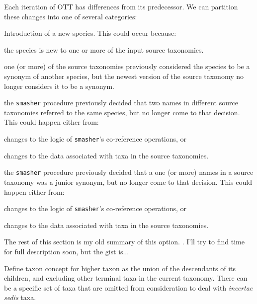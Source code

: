\documentclass[11pt]{article}
\newcommand{\mthcomment}[1]{{\color{red} #1}\xspace}
\begin{document}
Each iteration of OTT has differences from its predecessor.
We can partition these changes into one of several categories:
\begin{compactenum}
  \item Introduction of a new species. This could occur because:
  \begin{compactenum}
    \item the species is new to one or more of the input source taxonomies.
    \item one (or more) of the source taxonomies previously considered the species to be
      a synonym of another species, but the newest version of the source taxonomy no longer
      considers it to be a synonym.
    \item the {\tt smasher} procedure previously decided that two names in different source
      taxonomies referred to the same species, but no longer come to that decision. 
      This could happen either from:
      \begin{compactenum}
        \item changes to the logic of {\tt smasher}'s co-reference operations, or
        \item changes to the data associated with taxa in the source taxonomies.
      \end{compactenum}
    \item the {\tt smasher} procedure previously decided that a one (or more)
      names in a source taxonomy was a junior synonym, but no longer come to that decision. 
      This could happen either from:
      \begin{compactenum}
        \item changes to the logic of {\tt smasher}'s co-reference operations, or
        \item changes to the data associated with taxa in the source taxonomies.
      \end{compactenum}

  \end{compactenum}
\end{compactenum}

\mthcomment{The rest of this section is my old summary
of this option. . I'll try to find time for full description soon, but
the gist is$\ldots$}

Define taxon concept for higher taxon as the union of the descendants of its children, and excluding other terminal taxa in the current taxonomy.
There can be a specific set of taxa that are omitted from consideration to deal with 
{\em incertae sedis} taxa.
\end{document}
